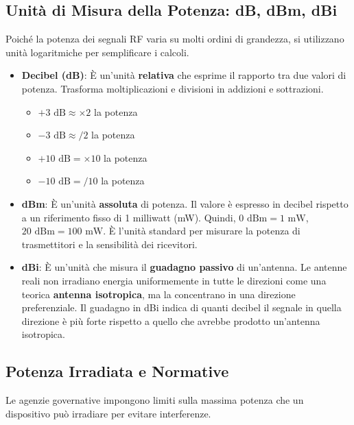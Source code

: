 \subsection{Unità di Misura della Potenza: dB, dBm, dBi}
Poiché la potenza dei segnali RF varia su molti ordini di grandezza, si utilizzano unità logaritmiche per semplificare i calcoli.
\begin{itemize}
    \item \textbf{Decibel (dB)}: È un'unità \textbf{relativa} che esprime il rapporto tra due valori di potenza. Trasforma moltiplicazioni e divisioni in addizioni e sottrazioni.
    \begin{itemize}
        \item $+3 \text{ dB} \approx \times 2$ la potenza
        \item $-3 \text{ dB} \approx / 2$ la potenza
        \item $+10 \text{ dB} = \times 10$ la potenza
        \item $-10 \text{ dB} = / 10$ la potenza
    \end{itemize}
    \item \textbf{dBm}: È un'unità \textbf{assoluta} di potenza. Il valore è espresso in decibel rispetto a un riferimento fisso di 1 milliwatt (mW). Quindi, $0 \text{ dBm} = 1 \text{ mW}$, $20 \text{ dBm} = 100 \text{ mW}$. È l'unità standard per misurare la potenza di trasmettitori e la sensibilità dei ricevitori.
    \item \textbf{dBi}: È un'unità che misura il \textbf{guadagno passivo} di un'antenna. Le antenne reali non irradiano energia uniformemente in tutte le direzioni come una teorica \textbf{antenna isotropica}, ma la concentrano in una direzione preferenziale. Il guadagno in dBi indica di quanti decibel il segnale in quella direzione è più forte rispetto a quello che avrebbe prodotto un'antenna isotropica.
\end{itemize}

\subsection{Potenza Irradiata e Normative}
Le agenzie governative impongono limiti sulla massima potenza che un dispositivo può irradiare per evitare interferenze.


